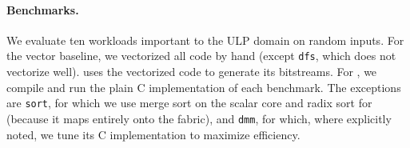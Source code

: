 \paragraph{Benchmarks.}
We evaluate ten workloads important to the ULP domain on random inputs.
% 
For the vector baseline, we vectorized all code by hand (except {\tt dfs}, which does not 
vectorize well).
% 
\snafu uses the vectorized code to generate its bitstreams.
% 
For \riptide, we compile and run the plain C implementation of each benchmark.
%
The exceptions are {\tt sort}, for which we use merge sort on the scalar core and
radix sort for \riptide (because it maps entirely onto the fabric),
and {\tt dmm}, for which, where explicitly noted, we tune its C implementation to maximize efficiency.
% 

